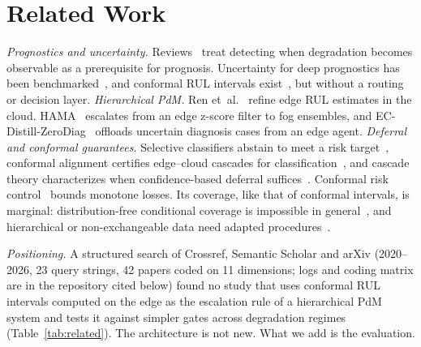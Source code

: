 \documentclass[conference]{IEEEtran}
\begin{document}
\section{Related Work}\label{sec:related}
\textit{Prognostics and uncertainty.} Reviews~\cite{lei2018machinery} treat detecting when degradation becomes observable as a prerequisite for prognosis. Uncertainty for deep prognostics has been benchmarked~\cite{basora2025benchmark}, and conformal RUL intervals exist~\cite{javanmardi2023conformal,wang2026conformal}, but without a routing or decision layer.
\textit{Hierarchical PdM.} Ren et~al.~\cite{ren2021cloudedge} refine edge RUL estimates in the cloud. HAMA~\cite{saleh2026hama} escalates from an edge z-score filter to fog ensembles, and EC-Distill-ZeroDiag~\cite{yao2026ecdistill} offloads uncertain diagnosis cases from an edge agent.
\textit{Deferral and conformal guarantees.} Selective classifiers abstain to meet a risk target~\cite{geifman2017selective}, conformal alignment certifies edge--cloud cascades for classification~\cite{huang2025cab}, and cascade theory characterizes when confidence-based deferral suffices~\cite{jitkrittum2023cascade}. Conformal risk control~\cite{angelopoulos2024crc} bounds monotone losses. Its coverage, like that of conformal intervals, is marginal: distribution-free conditional coverage is impossible in general~\cite{foygel2021limits}, and hierarchical or non-exchangeable data need adapted procedures~\cite{dunn2023hierarchical,barber2023beyond}.

\textit{Positioning.} A structured search of Crossref, Semantic Scholar and arXiv (2020--2026, 23 query strings, 42 papers coded on 11 dimensions; logs and coding matrix are in the repository cited below) found no study that uses conformal RUL intervals computed on the edge as the escalation rule of a hierarchical PdM system and tests it against simpler gates across degradation regimes (Table~\ref{tab:related}). The architecture is not new. What we add is the evaluation.
\end{document}
